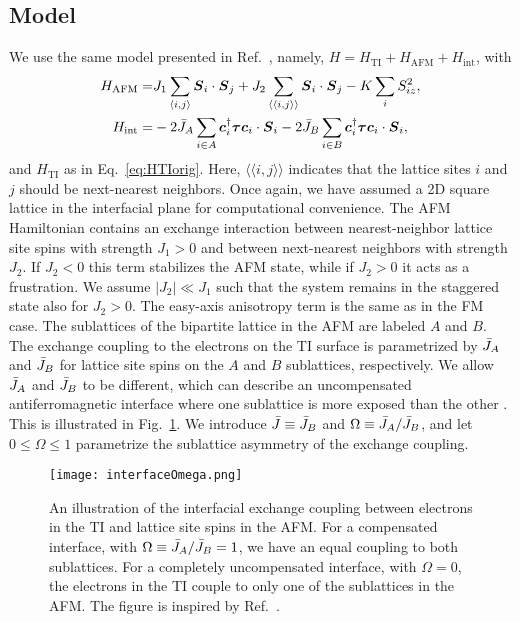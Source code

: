 \documentclass[aps, prb, twocolumn,amsmath,amssymb,floatfix]{revtex4-2}
\begin{document}
\subsection{Model}
We use the same model presented in Ref.~\cite{EirikTIFMAFM}, namely, $H = H_{\textrm{TI}} + H_{\textrm{AFM}}+ H_{\textrm{int}}$, with
\begin{align}
    H_{\textrm{AFM}} =& J_1 \sum_{\langle i,j \rangle} \boldsymbol{S}_i \cdot \boldsymbol{S}_j + J_2 \sum_{\langle\langle i,j \rangle\rangle} \boldsymbol{S}_i \cdot \boldsymbol{S}_j - K \sum_{i} S_{iz}^2 , \\
    H_{\textrm{int}} =& -2\Bar{J}_A \sum_{i\in A} \boldsymbol{c}_i^\dagger \boldsymbol{\tau} \boldsymbol{c}_{i} \cdot \boldsymbol{S}_i-2\Bar{J}_B \sum_{i\in B} \boldsymbol{c}_i^\dagger \boldsymbol{\tau} \boldsymbol{c}_{i} \cdot \boldsymbol{S}_i,
\end{align}
and $H_{\textrm{TI}}$ as in Eq.~\eqref{eq:HTIorig}. Here,  $\langle\langle i,j \rangle\rangle$ indicates  that the lattice sites $i$ and $j$ should be next-nearest neighbors. Once again, we have assumed a 2D square lattice in the interfacial plane for computational convenience. The AFM Hamiltonian contains an exchange interaction between nearest-neighbor lattice site spins with strength $J_1> 0$ and between next-nearest neighbors with strength $J_2$. If $J_2 < 0$ this term stabilizes the AFM state, while if $J_2>0$ it acts as a frustration. We assume $|J_2| \ll J_1$ such that the system remains in the staggered state also for $J_2>0$. The easy-axis anisotropy term is the same as in the FM case. The sublattices of the bipartite lattice in the AFM are labeled $A$ and $B$. The exchange coupling to the electrons on the TI surface is parametrized by $\Bar{J}_A$ and $\Bar{J}_B$ for lattice site spins on the $A$ and $B$ sublattices, respectively. We allow $\Bar{J}_A$ and $\Bar{J}_B$ to be different, which can describe an uncompensated antiferromagnetic interface where one sublattice is more exposed than the other \cite{EirikTIFMAFM}. This is illustrated in Fig.~\ref{fig:interfaceOmega}. 
We introduce $\Bar{J} \equiv \Bar{J}_B$ and $\Omega \equiv \Bar{J}_A/\Bar{J}_B$, and let $0 \leq \Omega \leq 1$ parametrize the sublattice asymmetry of the exchange coupling.

\begin{figure}
    \centering
    \texttt{[image: interfaceOmega.png]}
    \caption{An illustration of the interfacial exchange coupling between electrons in the TI and lattice site spins in the AFM. For a compensated interface, with $\Omega \equiv \Bar{J}_A/\Bar{J}_B = 1$, we have an equal coupling to both sublattices. For a completely uncompensated interface, with $\Omega = 0$, the electrons in the TI couple to only one of the sublattices in the AFM. The figure is inspired by Ref.~\cite{EirikTIFMAFM}.}
    \label{fig:interfaceOmega}
\end{figure}
\end{document}
